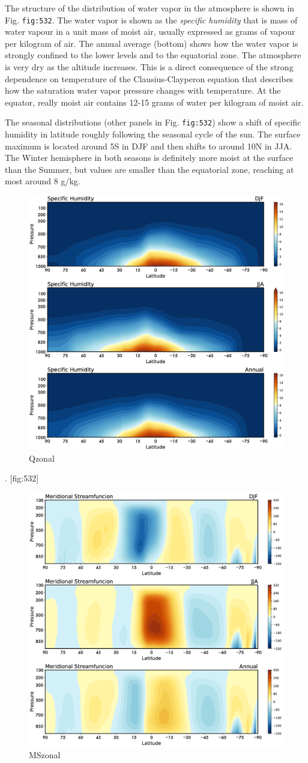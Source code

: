 The structure of the distribution of water vapor in the atmosphere is
shown in Fig. \texttt{fig:532}. The water vapor is shown as the
\emph{specific humidity} that is mass of water vapour in a unit mass of
moist air, usually expressed as grams of vapour per kilogram of air. The
annual average (bottom) shows how the water vapor is strongly confined
to the lower levels and to the equatorial zone. The atmosphere is very
dry as the altitude increases. This is a direct consequence of the
strong dependence on temperature of the Clausius-Clayperon equation that
describes how the saturation water vapor pressure changes with
temperature. At the equator, really moist air contains 12-15 grams of
water per kilogram of moist air.

The seasonal distributions (other panels in Fig. \texttt{fig:532}) show
a shift of specific humidity in latitude roughly following the seasonal
cycle of the sun. The surface maximum is located around 5S in DJF and
then shifts to around 10N in JJA. The Winter hemisphere in both seasons
is definitely more moist at the surface than the Summer, but values are
smaller than the equatorial zone, reaching at most around 8 g/kg.

\begin{figure}[h!]
    \centering
    \includegraphics[width=0.5\linewidth]{uploads/Screenshot 2024-11-19 132133.png}
    \caption{Qzonal}
    \label{fig:enter-label}
\end{figure}

. {[}fig:532{]}

\begin{figure}[h!]
    \centering
    \includegraphics[width=0.5\linewidth]{uploads/Screenshot 2024-11-19 132224.png}
    \caption{MSzonal}
    \label{fig:enter-label}
\end{figure}


